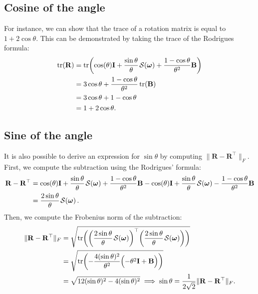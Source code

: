\subsection{Cosine of the angle}
For instance, we can show that the trace of a rotation matrix is equal to $1+2\cos\theta$. This can be demonstrated by taking the trace of the Rodrigues formula:
\begin{align}
    \tr(\mathbf{R}) &= \tr\biggl(\cos(\theta)\mathbf{I} + \frac{\sin\theta}{\theta}\SL[\boldsymbol{\omega}] + \frac{1-\cos\theta}{\theta^2}\mathbf{B}\biggr)\\
    &= 3\cos\theta + \frac{1-\cos\theta}{\theta^2}\tr(\mathbf{B})\\
    &= 3\cos\theta + 1-\cos\theta\\
    &= 1+2\cos\theta.
\end{align}

\subsection{Sine of the angle}
It is also possible to derive an expression for $\sin\theta$ by computing $\|\mathbf{R} - \mathbf{R}^\top\|_F$. First, we compute the subtraction using the Rodrigues' formula:
\begin{align}
        \mathbf{R} - \mathbf{R}^\top &= \cos(\theta)\mathbf{I} + \frac{\sin\theta}{\theta}\SL[\boldsymbol{\omega}] + \frac{1-\cos\theta}{\theta^2}\mathbf{B} - \cos(\theta)\mathbf{I} + \frac{\sin\theta}{\theta}\SL[\boldsymbol{\omega}] - \frac{1-\cos\theta}{\theta^2}\mathbf{B}\nonumber\\
        &= \frac{2\sin\theta}{\theta}\SL[\boldsymbol{\omega}].
\end{align}
Then, we compute the Frobenius norm of the subtraction:
\begin{align}
    \|\mathbf{R} - \mathbf{R}^\top\|_F &= \sqrt{\tr\biggl(\biggl(\frac{2\sin\theta}{\theta}\SL[\boldsymbol{\omega}]\biggr)^\top\biggl(\frac{2\sin\theta}{\theta}\SL[\boldsymbol{\omega}]\biggr)\biggr)}\\
    &= \sqrt{\tr\biggl(-\frac{4(\sin\theta)^2}{\theta^2}\Bigl( -\theta^2\mathbf{I} + \mathbf{B}\Bigr)\biggr)}\\
    &=\sqrt{ 12(\sin\theta)^2 - 4(\sin\theta)^2}
    \implies \sin\theta = \frac{1}{2\sqrt{2}}\|\mathbf{R} - \mathbf{R}^\top\|_F.
\end{align}
